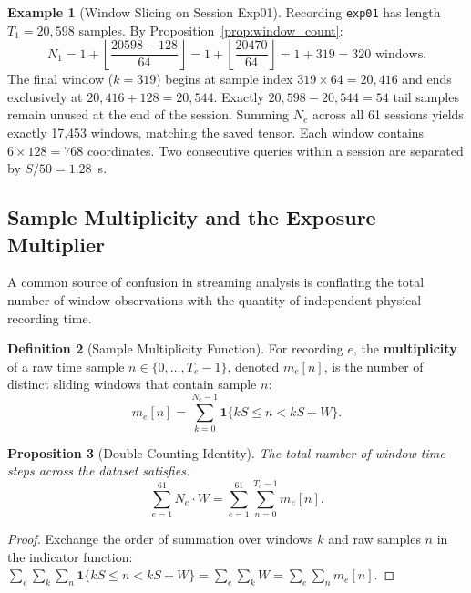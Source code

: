 \documentclass[11pt,a4paper]{article}
\newcommand{\code}[1]{{\small\ttfamily\nolinkurl{#1}}}
\newtheorem{proposition}{Proposition}[section]
\theoremstyle{definition}
\newtheorem{definition}[proposition]{Definition}
\newtheorem{example}[proposition]{Example}
\begin{document}
\begin{example}[Window Slicing on Session Exp01]
Recording \code{exp01} has length $T_1 = 20,598$ samples. By Proposition~\ref{prop:window_count}:
\begin{equation*}
N_1 = 1 + \left\lfloor \frac{20598 - 128}{64} \right\rfloor = 1 + \left\lfloor \frac{20470}{64} \right\rfloor = 1 + 319 = 320\text{ windows}.
\end{equation*}
The final window ($k=319$) begins at sample index $319 \times 64 = 20,416$ and ends exclusively at $20,416 + 128 = 20,544$. Exactly $20,598 - 20,544 = 54$ tail samples remain unused at the end of the session. Summing $N_e$ across all 61 sessions yields exactly 17,453 windows, matching the saved tensor. Each window contains $6 \times 128 = 768$ coordinates. Two consecutive queries within a session are separated by $S/50 = 1.28$~s.
\end{example}

\subsection{Sample Multiplicity and the Exposure Multiplier}
A common source of confusion in streaming analysis is conflating the total number of window observations with the quantity of independent physical recording time.

\begin{definition}[Sample Multiplicity Function]
For recording $e$, the \textbf{multiplicity} of a raw time sample $n \in \{0, \ldots, T_e - 1\}$, denoted $m_e[n]$, is the number of distinct sliding windows that contain sample $n$:
\begin{equation}
m_e[n] = \sum_{k=0}^{N_e - 1} \mathbf{1}\{kS \le n < kS + W\}.
\end{equation}
\end{definition}

\begin{proposition}[Double-Counting Identity]
The total number of window time steps across the dataset satisfies:
\begin{equation}
\sum_{e=1}^{61} N_e \cdot W = \sum_{e=1}^{61} \sum_{n=0}^{T_e - 1} m_e[n].
\end{equation}
\end{proposition}
\begin{proof}
Exchange the order of summation over windows $k$ and raw samples $n$ in the indicator function: $\sum_e \sum_k \sum_n \mathbf{1}\{kS \le n < kS + W\} = \sum_e \sum_k W = \sum_e \sum_n m_e[n]$.
\end{proof}
\end{document}
